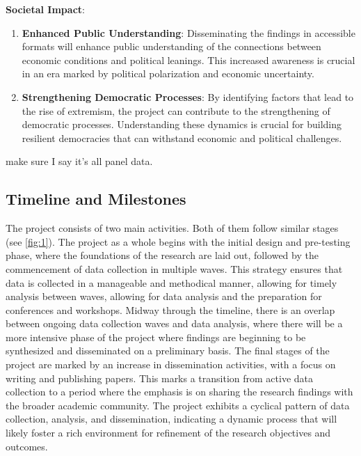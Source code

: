 \documentclass[letterpaper]{article}
\renewenvironment{itemize}{
  \begin{list}{}{
    \setlength{\leftmargin}{1.5em}
  }
}{
  \end{list}
}
\begin{document}
\begin{itemize}
  \item {\bf Societal Impact}: 
    \begin{enumerate}
      \item {\bf Enhanced Public Understanding}: Disseminating the findings in accessible formats will enhance public understanding of the connections between economic conditions and political leanings. This increased awareness is crucial in an era marked by political polarization and economic uncertainty.
      \item {\bf Strengthening Democratic Processes}: By identifying factors that lead to the rise of extremism, the project can contribute to the strengthening of democratic processes. Understanding these dynamics is crucial for building resilient democracies that can withstand economic and political challenges.
    \end{enumerate}

\end{itemize}

{\color{red}make sure I say it's all panel data.}

\subsection*{Timeline and Milestones}

The project consists of two main activities. Both of them follow similar stages (see \autoref{fig:1}). The project as a whole begins with the initial design and pre-testing phase, where the foundations of the research are laid out, followed by the commencement of data collection in multiple waves. This strategy ensures that data is collected in a manageable and methodical manner, allowing for timely analysis between waves, allowing for data analysis and the preparation for conferences and workshops. Midway through the timeline, there is an overlap between ongoing data collection waves and data analysis, where there will be a more intensive phase of the project where findings are beginning to be synthesized and disseminated on a preliminary basis. The final stages of the project are marked by an increase in dissemination activities, with a focus on writing and publishing papers. This marks a transition from active data collection to a period where the emphasis is on sharing the research findings with the broader academic community. The project exhibits a cyclical pattern of data collection, analysis, and dissemination, indicating a dynamic process that will likely foster a rich environment for refinement of the research objectives and outcomes.
\end{document}
